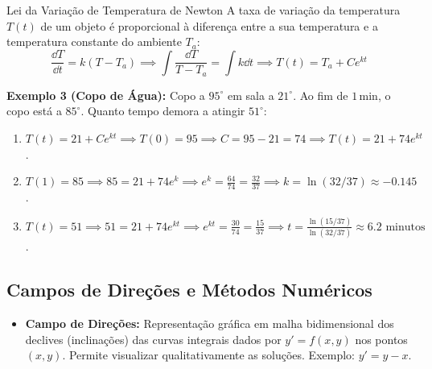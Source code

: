 \documentclass[11pt,a4paper]{article}
\begin{document}
\noindent\begin{theorembox}{Lei da Variação de Temperatura de Newton}
  A taxa de variação da temperatura $T(t)$ de um objeto é proporcional à diferença entre a sua temperatura e a temperatura constante do ambiente $T_a$:
  \[
    \frac{\dd T}{\dd t} = k(T - T_a) \implies \int \frac{\dd T}{T-T_a} = \int k \dd t \implies T(t) = T_a + C e^{kt}
  \]

  \vspace{1em}

  \textbf{Exemplo 3 (Copo de Água):} Copo a $95^\circ$ em sala a $21^\circ$. Ao fim de $1$\,min, o copo está a $85^\circ$. Quanto tempo demora a atingir $51^\circ$:
  \begin{enumerate}
    \item $T(t) = 21 + C e^{kt} \implies T(0) = 95 \implies C = 95 - 21 = 74 \implies T(t) = 21 + 74 e^{kt}$.
    \item $T(1) = 85 \implies 85 = 21 + 74 e^{k} \implies e^k = \frac{64}{74} = \frac{32}{37} \implies k = \ln(32/37) \approx -0.145$.
    \item $T(t) = 51 \implies 51 = 21 + 74 e^{kt} \implies e^{kt} = \frac{30}{74} = \frac{15}{37} \implies t = \frac{\ln(15/37)}{\ln(32/37)} \approx 6.2 \text{ minutos}$.
  \end{enumerate}
\end{theorembox}

\newpage

\subsection{Campos de Direções e Métodos Numéricos}
\begin{itemize}
  \item \textbf{Campo de Direções:} Representação gráfica em malha bidimensional dos declives (inclinações) das curvas integrais dados por $y' = f(x, y)$ nos pontos $(x, y)$. Permite visualizar qualitativamente as soluções. Exemplo: $y' = y - x$.
\end{itemize}
\end{document}
